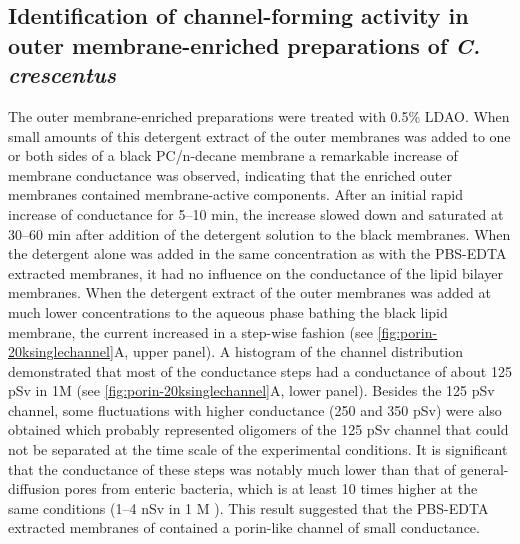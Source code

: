 \subsection{Identification of channel-forming activity in outer membrane-enriched  preparations of \textit{C. crescentus}}
The outer membrane-enriched  preparations were treated with 0.5\% \ac{LDAO}. When small amounts of this detergent extract of the outer membranes was added to one or both sides of a black \ac{PC}/n-decane membrane a remarkable increase of membrane conductance was observed, indicating that the enriched outer membranes contained membrane-active components. %
After an initial rapid increase of conductance for 5--10 min, the increase slowed down and saturated at 30--60 min after addition of the detergent solution to the black membranes. When the detergent alone was added in the same concentration as with the \ac{PBS}-\ac{EDTA} extracted membranes, it had no influence on the conductance of the lipid bilayer membranes. When the detergent extract of the outer membranes was added at much lower concentrations to the aqueous phase bathing the black lipid membrane, the current increased in a step-wise fashion (see \cref{fig:porin-20ksinglechannel}A, upper panel). A histogram of the channel distribution demonstrated that most of the conductance steps had a conductance of about 125 \si{\pico\sievert} in 1M  (see \cref{fig:porin-20ksinglechannel}A, lower panel). Besides the 125 \si{\pico\sievert} channel, some fluctuations with higher conductance (250 and 350 \si{\pico\sievert}) were also obtained which probably represented oligomers of the 125 \si{\pico\sievert} channel that could not be separated at the time scale of the experimental conditions. It is significant that the conductance of these steps was notably much lower than that of general-diffusion pores from enteric bacteria, which is at least 10 times higher at the same conditions (1--4 \si{\nano\sievert} in 1 M ). This result suggested that the \ac{PBS}-\ac{EDTA} extracted membranes of \caulobacter contained a porin-like channel of small conductance. 


